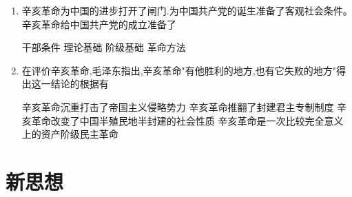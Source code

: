\documentclass[12pt, a4paper, oneside, UTF8]{ctexbook}
\begin{document}
\begin{enumerate}
    \item \bl 辛亥革命为中国的进步打开了闸门.为中国共产党的诞生准备了客观社会条件。辛亥革命给中国共产党的成立准备了
    \begin{choices}[2]
    \task 干部条件
    \task 理论基础
    \task 阶级基础
    \task 革命方法
    \end{choices}
    
    \item \bl 在评价辛亥革命,毛泽东指出,辛亥革命"有他胜利的地方,也有它失败的地方"得出这一结论的根据有
    \begin{choices}[1]
    \task 辛亥革命沉重打击了帝国主义侵略势力
    \task 辛亥革命推翻了封建君主专制制度
    \task 辛亥革命改变了中国半殖民地半封建的社会性质
    \task 辛亥革命是一次比较完全意义上的资产阶级民主革命
    \end{choices}

\end{enumerate}
\section{新思想}
\end{document}
